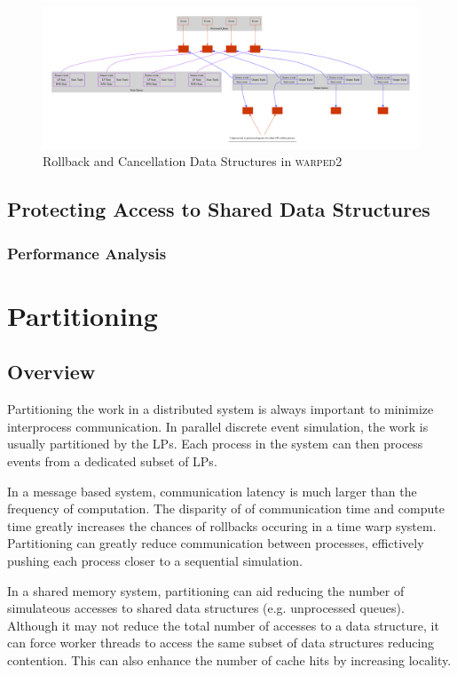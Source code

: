 \documentclass[11pt]{book}
\begin{document}
\begin{figure}[H]
    \centering
    \includegraphics[width=\textwidth]{figs/graphviz/rollback_ds.pdf}
    \caption{Rollback and Cancellation Data Structures in \textsc{warped2}}\label{rollback_ds}
\end{figure}

\section{Protecting Access to Shared Data Structures}

\subsection{Performance Analysis}

\chapter{Partitioning}\label{partitioning}

\section{Overview}

Partitioning the work in a distributed system is always important to minimize interprocess
communication. In parallel discrete event simulation, the work is usually partitioned by
the LPs. Each process in the system can then process events from a dedicated subset of LPs.

In a message based system, communication latency is much larger than the frequency of
computation. The disparity of of communication time and compute time greatly increases
the chances of rollbacks occuring in a time warp system. Partitioning can greatly reduce
communication between processes, effictively pushing each process closer to a sequential
simulation.

In a shared memory system, partitioning can aid reducing the number of simulateous accesses
to shared data structures (e.g. unprocessed queues). Although it may not reduce the total
number of accesses to a data structure, it can force worker threads to access the same
subset of data structures reducing contention. This can also enhance the number of cache
hits by increasing locality.
\end{document}
